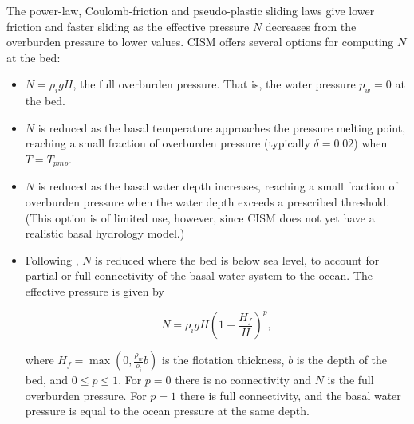 The power-law, Coulomb-friction and pseudo-plastic sliding laws 
give lower friction and faster sliding as the effective pressure $N$ decreases 
from the overburden pressure to lower values.  
CISM offers several options for computing $N$ at the bed:

\begin{itemize}

\item $N = \rho_i g H$, the full overburden pressure. That is, the water pressure $p_w = 0$
at the bed.

\item $N$ is reduced as the basal temperature approaches the pressure melting point, 
reaching a small fraction of overburden pressure (typically $\delta =0.02$) when $T = T_{pmp}$.

\item $N$ is reduced as the basal water depth increases, reaching a small fraction of overburden
pressure when the water depth exceeds a prescribed threshold.
(This option is of limited use, however, since CISM
does not yet have a realistic basal hydrology model.)

\item Following \citet{Leguy2014}, $N$ is reduced where the bed is below sea level, to account
for partial or full connectivity of the basal water system to the ocean.
The effective pressure is given by

\begin{equation}
  N = {{\rho }_{i}}gH{{\left( 1-\frac{{{H}_{f}}}{H} \right)}^{p}},
\end{equation}

\noindent
where ${{H}_{f}} = \max \left( 0,\frac{{{\rho }_{w}}}{{{\rho }_{i}}}b \right)$
is the flotation thickness, $b$ is the depth of the bed, and $0 \le p \le 1$. 
For $p = 0$ there is no connectivity and $N$ is the full overburden pressure.
For $p = 1$ there is full connectivity, and the basal water pressure is equal to the ocean pressure at the same depth.
\end{itemize}
